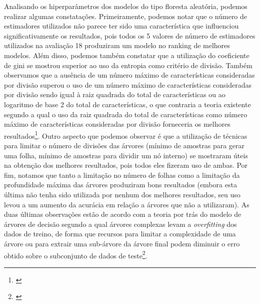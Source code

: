 Analisando os hiperparâmetros dos modelos do tipo floresta aleatória, podemos realizar algumas constatações. Primeiramente, podemos notar que o número de estimadores utilizados não parece ter sido uma característica que influenciou significativamente os resultados, pois todos os 5 valores de número de estimadores utilizados na avaliação 18 produziram um modelo no ranking de melhores modelos. Além disso, podemos também constatar que a utilização do coeficiente de gini se mostrou superior ao uso da entropia como critério de divisão. Também observamos que a ausência de um número máximo de características consideradas por divisão superou o uso de um número máximo de características consideradas por divisão sendo igual à raiz quadrada do total de características ou ao logaritmo de base 2 do total de características, o que contraria a teoria existente segundo a qual o uso da raiz quadrada do total de características como número máximo de características consideradas por divisão forneceria os melhores resultados\footnote{\cite[p.319-321]{statistical_learning}}. Outro aspecto que podemos observar é que a utilização de técnicas para limitar o número de divisões das árvores (mínimo de amostras para gerar uma folha, mínimo de amostras para dividir um nó interno) se mostraram úteis na obtenção dos melhores resultados, pois todos eles fizeram uso de ambas. Por fim, notamos que tanto a limitação no número de folhas como a limitação da profundidade máxima das árvores produziram bons resultados (embora esta última não tenha sido utilizada por nenhum dos melhores resultados, seu uso levou a um aumento da acurácia em relação a árvores que não a utilizaram). As duas últimas observações estão de acordo com a teoria por trás do modelo de árvores de decisão segundo a qual árvores complexas levam a \textit{overfitting} dos dados de treino, de forma que recursos para limitar a complexidade de uma árvore ou para extrair uma sub-árvore da árvore final podem diminuir o erro obtido sobre o subconjunto de dados de teste\footnote{\cite[p.307-311]{statistical_learning}}.

